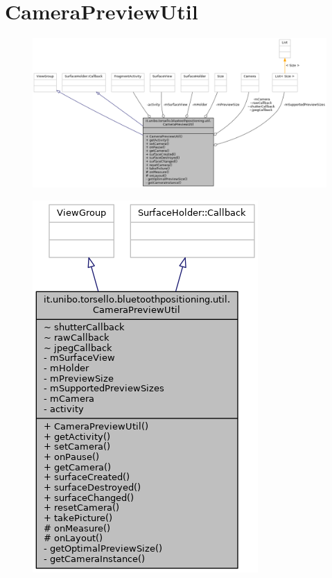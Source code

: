 \newpage
\section{CameraPreviewUtil}
\begin{figure}[ph]
	\centering
	\includegraphics[width=1.2\linewidth]{img/uml/class/classit_1_1unibo_1_1torsello_1_1bluetoothpositioning_1_1util_1_1CameraPreviewUtil__coll__graph.png}
	\caption{}
\end{figure}

\begin{figure}[ph]
	\centering
	\includegraphics[width=0.5\linewidth]{img/uml/class/classit_1_1unibo_1_1torsello_1_1bluetoothpositioning_1_1util_1_1CameraPreviewUtil__inherit__graph.png}
	\caption{}
\end{figure}

\newpage
